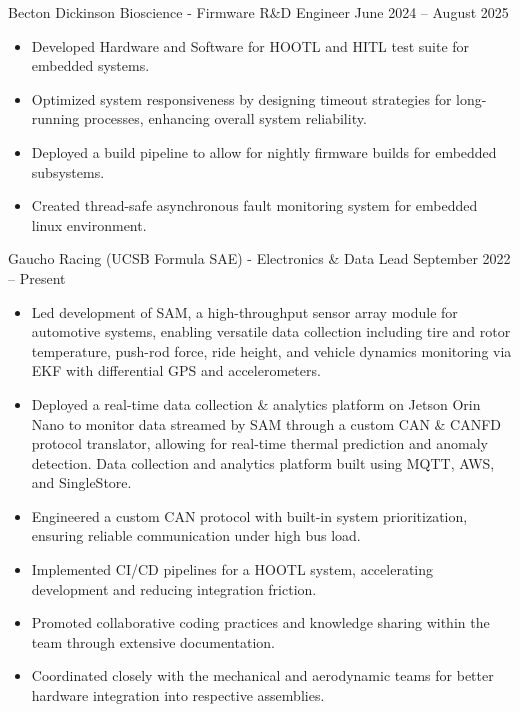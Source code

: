\documentclass[9pt]{developercv} %
\begin{document}
\vspace{-16 pt}
\begin{entrylist}
    \entry
        {}
        {Becton Dickinson Bioscience - Firmware R\&D Engineer}
        {June 2024 – August 2025}
        {\vspace{-8pt}
        \begin{itemize}[noitemsep,topsep=0pt,parsep=0pt,partopsep=0pt, leftmargin=10pt]
            \item Developed Hardware and Software for HOOTL and HITL test suite for embedded systems. 
            \item Optimized system responsiveness by designing timeout strategies for long-running processes, enhancing overall system reliability. 
            \item Deployed a build pipeline to allow for nightly firmware builds for embedded subsystems.  
            \item Created thread-safe asynchronous fault monitoring system for embedded linux environment. 
        \end{itemize}}
    \entry
        {}
        {Gaucho Racing (UCSB Formula SAE) - Electronics \& Data Lead}
        {September 2022 – Present}
        {\vspace{-8pt}
        \begin{itemize}[noitemsep,topsep=0pt,parsep=0pt,partopsep=0pt, leftmargin=10pt]
            \item Led development of SAM, a high-throughput sensor array module for automotive systems, enabling versatile data collection including tire and rotor temperature, push-rod force, ride height, and vehicle dynamics monitoring via EKF with differential GPS and accelerometers.
            \item Deployed a real-time data collection \& analytics platform on Jetson Orin Nano to monitor data streamed by SAM through a custom CAN \& CANFD protocol translator, allowing for real-time thermal prediction and anomaly detection. Data collection and analytics platform built using MQTT, AWS, and SingleStore. 
            \item Engineered a custom CAN protocol with built-in system prioritization, ensuring reliable communication under high bus load. 
            \item Implemented CI/CD pipelines for a HOOTL system, accelerating development and reducing integration friction.
            \item Promoted collaborative coding practices and knowledge sharing within the team through
            extensive documentation.
            \item Coordinated closely with the mechanical and aerodynamic teams for better hardware integration into respective assemblies.  
            
        \end{itemize}}
\end{entrylist}
\end{document}
